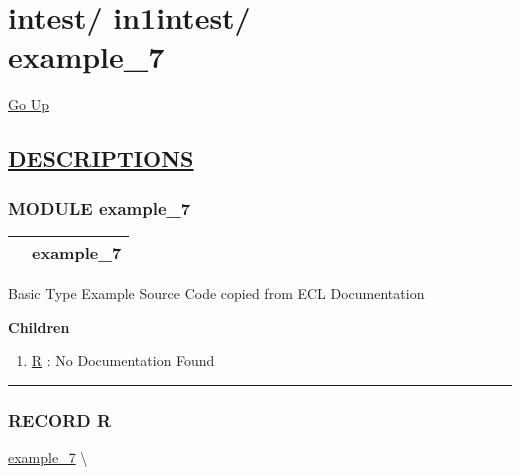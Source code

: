 \chapter*{\color{headfile}
{\large intest\slash\hspace{0pt}}
{\large in1intest\slash\hspace{0pt}}
 \\
example_7
}
\hypertarget{ecldoc:toc:intest.in1intest.example_7}{}
\hyperlink{ecldoc:toc:root/intest/in1intest}{Go Up}


\section*{\underline{\textsf{DESCRIPTIONS}}}
\subsection*{\textsf{\colorbox{headtoc}{\color{white} MODULE}
example\_7}}

\hypertarget{ecldoc:intest.in1intest.example_7}{}

{\renewcommand{\arraystretch}{1.5}
\begin{tabularx}{\textwidth}{|>{\raggedright\arraybackslash}l|X|}
\hline
\hspace{0pt}\mytexttt{\color{red} } & \textbf{example\_7} \\
\hline
\end{tabularx}
}

\par





Basic Type Example Source Code copied from ECL Documentation







\textbf{Children}
\begin{enumerate}
\item \hyperlink{ecldoc:intest.in1intest.example_7.r}{R}
: No Documentation Found
\end{enumerate}

\rule{\linewidth}{0.5pt}

\subsection*{\textsf{\colorbox{headtoc}{\color{white} RECORD}
R}}

\hypertarget{ecldoc:intest.in1intest.example_7.r}{}
\hspace{0pt} \hyperlink{ecldoc:intest.in1intest.example_7}{example_7} \textbackslash 

